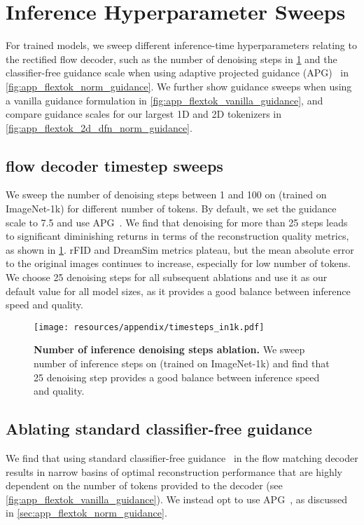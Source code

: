 \clearpage
\section{\ours Inference Hyperparameter Sweeps}
\label{sec:app_inference_hparam_sweeps}

For trained \ours models, we sweep different inference-time hyperparameters relating to the rectified flow decoder, such as the number of denoising steps in \cref{fig:app_flextok_timesteps} and the classifier-free guidance scale when using adaptive projected guidance (APG)~\cite{Sadat2024NormGuidance} in \cref{fig:app_flextok_norm_guidance}. We further show guidance sweeps when using a vanilla guidance formulation in \cref{fig:app_flextok_vanilla_guidance}, and compare guidance scales for our largest 1D and 2D tokenizers in \cref{fig:app_flextok_2d_dfn_norm_guidance}.


\subsection{\ours flow decoder timestep sweeps}
\label{sec:app_decoder_timestep_sweep}
We sweep the number of denoising steps between 1 and 100 on \oursxlarge (trained on ImageNet-1k) for different number of tokens. By default, we set the guidance scale to 7.5 and use APG~\cite{Sadat2024NormGuidance}. We find that denoising for more than 25 steps leads to significant diminishing returns in terms of the reconstruction quality metrics, as shown in \cref{fig:app_flextok_timesteps}. rFID and DreamSim metrics plateau, but the mean absolute error to the original images continues to increase, especially for low number of tokens. We choose 25 denoising steps for all subsequent ablations and use it as our default value for all model sizes, as it provides a good balance between inference speed and quality.

\begin{figure}[ht!]
\centering
\texttt{[image: resources/appendix/timesteps\_in1k.pdf]}
\caption{
\textbf{Number of inference denoising steps ablation.} We sweep number of inference steps on \oursxlarge (trained on ImageNet-1k) and find that 25 denoising step provides a good balance between inference speed and quality.
}
\label{fig:app_flextok_timesteps}
\end{figure}


\subsection{Ablating standard classifier-free guidance}
\label{sec:app_vanilla_guidance}
We find that using standard classifier-free guidance~\cite{Ho2022ClassifierFreeGuidance} in the flow matching decoder results in narrow basins of optimal reconstruction performance that are highly dependent on the number of tokens provided to the decoder (see \cref{fig:app_flextok_vanilla_guidance}). We instead opt to use APG~\cite{Sadat2024NormGuidance}, as discussed in \cref{sec:app_flextok_norm_guidance}.

